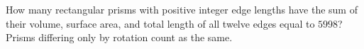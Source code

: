 How many rectangular prisms with positive integer edge lengths have the sum of their volume, surface area, and total length of all twelve edges equal to $5998$? Prisms differing only by rotation count as the same.
